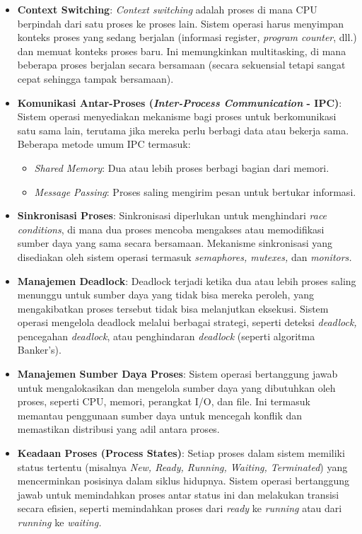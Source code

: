 \documentclass[12pt]{article}
\begin{document}
\begin{itemize}
    \item \textbf{Context Switching}: 
    \textit{Context switching} adalah proses di mana CPU berpindah dari satu proses ke proses lain. Sistem operasi harus menyimpan konteks proses yang sedang berjalan (informasi register, \textit{program counter}, dll.) dan memuat konteks proses baru. Ini memungkinkan multitasking, di mana beberapa proses berjalan secara bersamaan (secara sekuensial tetapi sangat cepat sehingga tampak bersamaan).
    
    \item \textbf{Komunikasi Antar-Proses (\textit{Inter-Process Communication} - IPC)}: 
    Sistem operasi menyediakan mekanisme bagi proses untuk berkomunikasi satu sama lain, terutama jika mereka perlu berbagi data atau bekerja sama. Beberapa metode umum IPC termasuk:
    \begin{itemize}
        \item \textit{Shared Memory}: Dua atau lebih proses berbagi bagian dari memori.
        \item \textit{Message Passing}: Proses saling mengirim pesan untuk bertukar informasi.
    \end{itemize}
    
    \item \textbf{Sinkronisasi Proses}: 
    Sinkronisasi diperlukan untuk menghindari \textit{race conditions}, di mana dua proses mencoba mengakses atau memodifikasi sumber daya yang sama secara bersamaan. Mekanisme sinkronisasi yang disediakan oleh sistem operasi termasuk\textit{ semaphores, mutexes,} dan \textit{monitors.}
    
    \item \textbf{Manajemen Deadlock}: 
    Deadlock terjadi ketika dua atau lebih proses saling menunggu untuk sumber daya yang tidak bisa mereka peroleh, yang mengakibatkan proses tersebut tidak bisa melanjutkan eksekusi. Sistem operasi mengelola deadlock melalui berbagai strategi, seperti deteksi \textit{deadlock, }pencegahan \textit{deadlock}, atau penghindaran \textit{deadlock} (seperti algoritma Banker's).
    
    \item \textbf{Manajemen Sumber Daya Proses}: 
    Sistem operasi bertanggung jawab untuk mengalokasikan dan mengelola sumber daya yang dibutuhkan oleh proses, seperti CPU, memori, perangkat I/O, dan file. Ini termasuk memantau penggunaan sumber daya untuk mencegah konflik dan memastikan distribusi yang adil antara proses.
    
    \item \textbf{Keadaan Proses (Process States)}: 
    Setiap proses dalam sistem memiliki status tertentu (misalnya \textit{New, Ready, Running, Waiting, Terminated}) yang mencerminkan posisinya dalam siklus hidupnya. Sistem operasi bertanggung jawab untuk memindahkan proses antar status ini dan melakukan transisi secara efisien, seperti memindahkan proses dari \textit{ready} ke \textit{running} atau dari \textit{running} ke \textit{waiting.}
\end{itemize}
\end{document}

